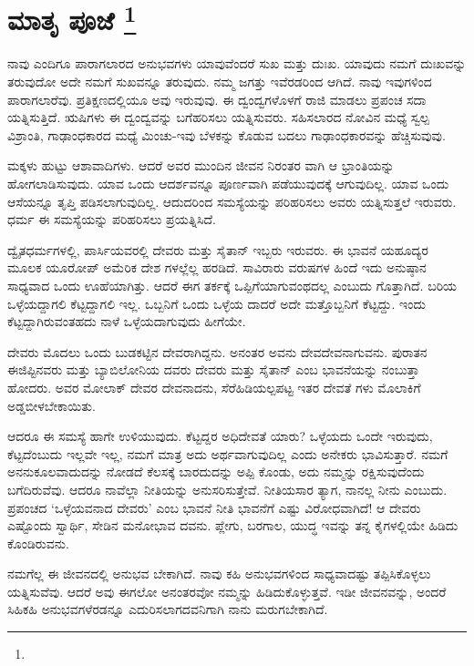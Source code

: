
\chapter[ಮಾತೃ ಪೂಜೆ ]{ಮಾತೃ ಪೂಜೆ \protect\footnote{}}

ನಾವು ಎಂದಿಗೂ ಪಾರಾಗಲಾರದ ಅನುಭವಗಳು ಯಾವುವೆಂದರೆ ಸುಖ ಮತ್ತು ದುಃಖ. ಯಾವುದು ನಮಗೆ ದುಃಖವನ್ನು ತರುವುದೋ ಅದೇ ನಮಗೆ ಸುಖವನ್ನೂ ತರುವುದು. ನಮ್ಮ ಜಗತ್ತು ಇವೆರಡರಿಂದ ಆಗಿದೆ. ನಾವು ಇವುಗಳಿಂದ ಪಾರಾಗಲಾರೆವು. ಪ್ರತಿಕ್ಷಣದಲ್ಲಿಯೂ ಅವು ಇರುವುವು. ಈ ದ್ವಂದ್ವಗಳೊಳಗೆ ರಾಜಿ ಮಾಡಲು ಪ್ರಪಂಚ ಸದಾ ಯತ್ನಿಸುತ್ತಿದೆ. ಋಷಿಗಳು ಈ ದ್ವಂದ್ವವನ್ನು ಬಗೆಹರಿಸಲು ಯತ್ನಿಸುವರು. ಸಹಿಸಲಾರದ ನೋವಿನ ಮಧ್ಯೆ ಸ್ವಲ್ಪ ವಿಶ್ರಾಂತಿ, ಗಾಢಾಂಧಕಾರದ ಮಧ್ಯೆ ಮಿಂಚು-ಇವು ಬೆಳಕನ್ನು ಕೊಡುವ ಬದಲು ಗಾಢಾಂಧಕಾರವನ್ನು ಹೆಚ್ಚಿಸುವುವು.

ಮಕ್ಕಳು ಹುಟ್ಟು ಆಶಾವಾದಿಗಳು. ಆದರೆ ಅವರ ಮುಂದಿನ ಜೀವನ ನಿರಂತರ ವಾಗಿ ಆ ಭ್ರಾಂತಿಯನ್ನು ಹೋಗಲಾಡಿಸುವುದು. ಯಾವ ಒಂದು ಆದರ್ಶವನ್ನೂ ಪೂರ್ಣವಾಗಿ ಪಡೆಯುವುದಕ್ಕೆ ಆಗುವುದಿಲ್ಲ. ಯಾವ ಒಂದು ಆಸೆಯನ್ನೂ ತೃಪ್ತಿ ಪಡಿಸಲಾಗುವುದಿಲ್ಲ. ಆದುದರಿಂದ ಸಮಸ್ಯೆಯನ್ನು ಪರಿಹರಿಸಲು ಅವರು ಯತ್ನಿಸುತ್ತಲೆ ಇರುವರು. ಧರ್ಮ ಈ ಸಮಸ್ಯೆಯನ್ನು ಪರಿಹರಿಸಲು ಪ್ರಯತ್ನಿಸಿದೆ.

ದ್ವೈತಧರ್ಮಗಳಲ್ಲಿ, ಪಾರ್ಸಿಯವರಲ್ಲಿ ದೇವರು ಮತ್ತು ಸೈತಾನ್​ ಇಬ್ಬರು ಇರುವರು. ಈ ಭಾವನೆ ಯಹೂದ್ಯರ ಮೂಲಕ ಯೂರೋಪ್​ ಅಮೆರಿಕ ದೇಶ ಗಳಲ್ಲೆಲ್ಲ ಹರಡಿದೆ. ಸಾವಿರಾರು ವರುಷಗಳ ಹಿಂದೆ ಇದು ಅನುಷ್ಠಾನ ಸಾಧ್ಯವಾದ ಒಂದು ಊಹೆಯಾಗಿತ್ತು. ಆದರೆ ಈಗ ತರ್ಕಕ್ಕೆ ಒಪ್ಪಿಗೆಯಾಗುವಂಥದಲ್ಲ ಎಂಬುದು ಗೊತ್ತಾಗಿದೆ. ಬರಿಯ ಒಳ್ಳೆಯದ್ದಾಗಲಿ ಕೆಟ್ಟದ್ದಾಗಲಿ ಇಲ್ಲ. ಒಬ್ಬನಿಗೆ ಒಂದು ಒಳ್ಳೆಯ ದಾದರೆ ಅದೇ ಮತ್ತೊಬ್ಬನಿಗೆ ಕೆಟ್ಟದ್ದು. ಇಂದು ಕೆಟ್ಟದ್ದಾಗಿರುವಂತಹದು ನಾಳೆ ಒಳ್ಳೆಯದಾಗುವುದು ಹೀಗೆಯೇ.

ದೇವರು ಮೊದಲು ಒಂದು ಬುಡಕಟ್ಟಿನ ದೇವರಾಗಿದ್ದನು. ಅನಂತರ ಅವನು ದೇವದೇವನಾಗುವನು. ಪುರಾತನ ಈಜಿಪ್ಟಿನವರು ಮತ್ತು ಬ್ಯಾಬಿಲೋನಿಯ ದವರು ದೇವರು ಮತ್ತು ಸೈತಾನ್​ ಎಂಬ ಭಾವನೆಯನ್ನು ನಂಬುತ್ತಾ ಹೋದರು. ಅವರ ಮೋಲಾಕ್​ ದೇವರ ದೇವನಾದನು, ಸೆರೆಹಿಡಿಯಲ್ಪಪಟ್ಟ ಇತರ ದೇವತೆ ಗಳು ಮೊಲಾಕಿಗೆ ಅಡ್ಡಬೀಳಬೇಕಾಯಿತು.

ಆದರೂ ಈ ಸಮಸ್ಯೆ ಹಾಗೇ ಉಳಿಯುವುದು. ಕೆಟ್ಟದ್ದರ ಅಧಿದೇವತೆ ಯಾರು? ಒಳ್ಳೆಯದು ಒಂದೇ ಇರುವುದು, ಕೆಟ್ಟದೆಂಬುದು ಇಲ್ಲವೇ ಇಲ್ಲ, ನಮಗೆ ಮಾತ್ರ ಅದು ಅರ್ಥವಾಗುವುದಿಲ್ಲ ಎಂದು ಅನೇಕರು ಭಾವಿಸುತ್ತಾರೆ. ನಮಗೆ ಅನನುಕೂಲವಾದುದನ್ನು ನೋಡದೆ ಕೆಲಸಕ್ಕೆ ಬಾರದುದನ್ನು ಅಪ್ಪಿ ಕೊಂಡು, ಅದು ನಮ್ಮನ್ನು ರಕ್ಷಿಸುವುದೆಂದು ಬಗೆದಿರುವೆವು. ಆದರೂ ನಾವೆಲ್ಲಾ ನೀತಿಯನ್ನು ಅನುಸರಿಸುತ್ತೇವೆ. ನೀತಿಯಸಾರ ತ್ಯಾಗ, ನಾನಲ್ಲ ನೀನು ಎಂಬುದು. ಪ್ರಪಂಚದ ‘ಒಳ್ಳೆಯವನಾದ ದೇವರು’ ಎಂಬ ಭಾವನೆ ನೀತಿ ಭಾವನೆಗೆ ಎಷ್ಟು ವಿರೋಧವಾಗಿದೆ! ಆ ದೇವರು ಎಷ್ಟೊಂದು ಸ್ವಾರ್ಥಿ, ಸೇಡಿನ ಮನೋಭಾವ ದವನು. ಪ್ಲೇಗು, ಬರಗಾಲ, ಯುದ್ಧ ಇವನ್ನು ತನ್ನ ಕೈಗಳಲ್ಲಿಯೇ ಹಿಡಿದು ಕೊಂಡಿರುವನು.

ನಮಗೆಲ್ಲ ಈ ಜೀವನದಲ್ಲಿ ಅನುಭವ ಬೇಕಾಗಿದೆ. ನಾವು ಕಹಿ ಅನುಭವಗಳಿಂದ ಸಾಧ್ಯವಾದಷ್ಟು ತಪ್ಪಿಸಿಕೊಳ್ಳಲು ಯತ್ನಿಸುವೆವು. ಆದರೆ ಅವು ಈಗಲೋ ಅನಂತರವೋ ನಮ್ಮನ್ನು ಹಿಡಿದುಕೊಳ್ಳುತ್ತವೆ. ಇಡೀ ಜೀವನವನ್ನು, ಅಂದರೆ ಸಿಹಿಕಹಿ ಅನುಭವಗಳೆರಡನ್ನೂ ಎದುರಿಸಲಾಗದವನಿಗಾಗಿ ನಾನು ಮರುಗಬೇಕಾಗಿದೆ.

